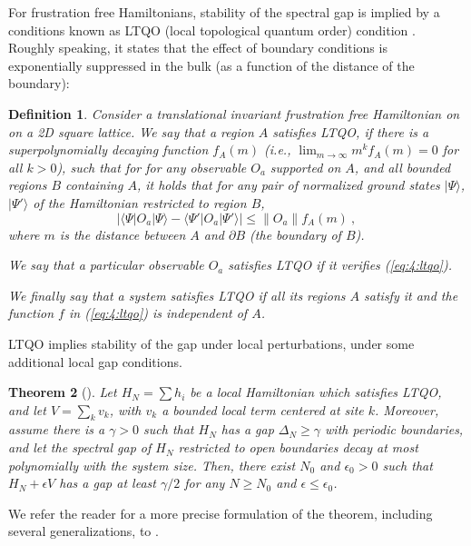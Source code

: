 \documentclass[rmp,aps,reprint,superscriptaddress,nobalancelastpage]{revtex4-1}
\newtheorem{thm}{Theorem}[section]
\newtheorem{defn}[thm]{Definition}
\newcommand{\ket}[1]{\vert#1\rangle}
\begin{document}
For frustration free Hamiltonians, stability of the spectral gap is implied by a conditions known as LTQO (local topological quantum order) condition \cite{bravyi:tqo-long,bravyi:local-tqo-simple,michalakis:local-tqo-ffree}.
Roughly speaking, it states that the effect of boundary conditions is exponentially suppressed in the bulk (as a function of the distance of the boundary):

\begin{defn}
    Consider a translational invariant frustration free Hamiltonian on on a 2D square lattice.  We say that a \emph{region $A$ satisfies LTQO},
    if there is a superpolynomially decaying function $f_A(m)$ (i.e.,
    $\lim_{m\rightarrow\infty}m^kf_A(m) = 0$ for all $k>0$), such that for
    for any observable $O_a$ supported on $A$, and all bounded regions
    $B$ containing $A$,
    it holds that for any pair of normalized ground states $\ket{\Psi}$, $\ket{\Psi'}$ of the Hamiltonian restricted to region $B$,
    \begin{equation}
        \label{eq:4:ltqo}
        \Big|\langle \Psi | O_a |\Psi\rangle
        -\langle \Psi'|O_a|\Psi'\rangle
        \Big| \le \|O_a\| f_A(m)\ ,
    \end{equation}
    where $m$ is the distance between $A$ and $\partial B$ (the boundary of $B$).

    We say that a particular \emph{observable $O_a$ satisfies LTQO} if it verifies (\ref{eq:4:ltqo}).

    We finally say that a \emph{system satisfies LTQO} if all its regions $A$ satisfy it and the function $f$ in (\ref{eq:4:ltqo}) is independent of $A$.
\end{defn}

LTQO implies stability of the gap under local perturbations, under some additional local gap conditions.
\begin{thm}[\textcite{michalakis:local-tqo-ffree}]
    \label{thm:Spiros-stability}
    Let $H_N=\sum h_i$ be a local Hamiltonian which satisfies LTQO, and let $V=\sum_{k} v_k$, with $v_k$ a bounded local term centered at site $k$. Moreover, assume there is a $\gamma>0$ such that $H_N$ has a gap $\Delta_N\ge \gamma$ with periodic boundaries, and let the spectral gap of $H_N$ restricted to open boundaries decay at most polynomially with the system size. Then, there exist $N_0$ and $\epsilon_0>0$ such that $H_N+\epsilon V$ has a gap at least $\gamma/2$ for any $N\ge N_0$ and $\epsilon\le \epsilon_0$.
\end{thm}
We refer the reader for a more precise formulation of the theorem, including several generalizations, to \textcite{michalakis:local-tqo-ffree,nachtergaele2020quasi}.
\end{document}
